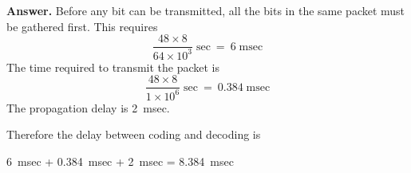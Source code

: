 
\textbf{Answer.} Before any bit can be transmitted, all the bits in
the same packet must be gathered first. This requires
\[
  \frac{48 \times 8}{64 \times 10^3} \; \text{sec}~ =~6 \;
  \text{msec}
\]
The time required to transmit the packet is
\[
  \frac{48 \times 8}{1 \times 10^{6}} \; \text{sec}~=~0.384
  \; \text{msec}
\]
The propagation delay is 2~msec.

Therefore the delay between coding and decoding is
\begin{center}
  6~msec + 0.384~msec + 2~msec = 8.384~msec
\end{center}
